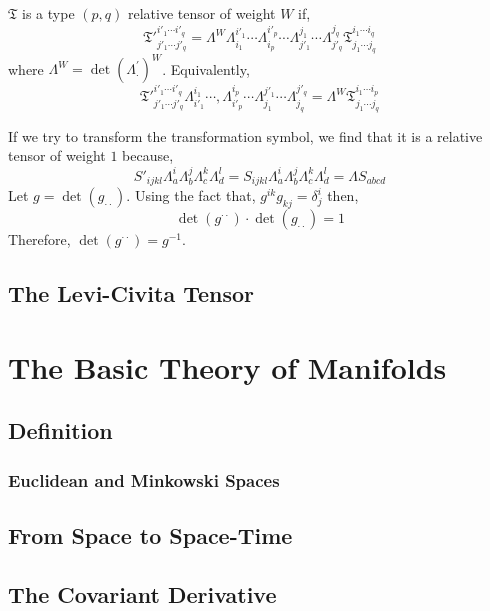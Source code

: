 \documentclass[11pt, a4paper]{article}
\begin{document}
\begin{definition}
$\mathfrak{T}$ is a type $(p,q)$ relative tensor of weight $W$ if,
\[ \mathfrak{T'}^{i'_1 \cdots i'_q}_{j'_1 \cdots j'_q} = \Lambda^W \Lambda^{i'_1}_{i_1} \cdots \Lambda^{i'_p}_{i_p} \cdots \Lambda^{j_1}_{j'_1} \cdots \Lambda^{j_q}_{j'_q} \mathfrak{T}^{i_1 \cdots i_q}_{j_1 \cdots j_q}\]
where $\Lambda^W = \det{(\Lambda^{'}_{\cdot})}^W$. Equivalently,
\[ \mathfrak{T'}^{i'_1 \cdots i'_q}_{j'_1 \cdots j'_q} \Lambda^{i_1}_{i'_1} \cdots , \Lambda^{i_p}_{i'_p} \cdots \Lambda^{j'_1}_{j_1} \cdots \Lambda^{j'_q}_{j_q} = \Lambda^W \mathfrak{T}^{i_1 \cdots i_p}_{j_1 \cdots j_q}\]
\end{definition}
If we try to transform the transformation symbol, we find that it is a relative tensor of weight $1$ because,
\[ S'_{ijkl} \Lambda^{i}_a \Lambda^j_b \Lambda^k_c \Lambda^l_d = S_{ijkl} \Lambda^{i}_a \Lambda^j_b \Lambda^k_c \Lambda^l_d = \Lambda S_{abcd} \] 
Let $g = \det{(g_{\cdot \cdot})}$. Using the fact that, $g^{ik} g_{kj} = \delta^i_j$ then,
\[ \det{(g^{\cdot \cdot})} \cdot \det{(g_{\cdot \cdot})} = 1 \]
Therefore, $\det{(g^{\cdot \cdot})} = g^{-1}$.   



\subsection{The Levi-Civita Tensor}

\section{The Basic Theory of Manifolds}

\subsection{Definition}

\subsubsection{Euclidean and Minkowski Spaces}

\subsection{From Space to Space-Time}

\subsection{The Covariant Derivative}
\end{document}
